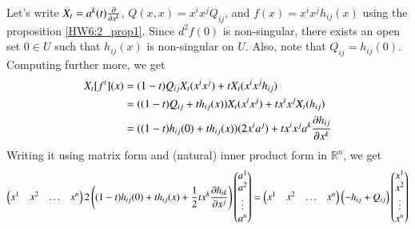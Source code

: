 \documentclass[a4paper, 12pt]{article}
\theoremstyle{Mydefinition}
\theoremstyle{Mytheorem}
\begin{document}
Let's write $X_t = a^k(t)\pdv{x^k}$, $Q(x,x)=x^ix^jQ_{ij}$, and $f(x) = x^ix^jh_{ij}(x)$ using the proposition \ref{HW6:2_prop1}. Since $d^2f(0)$ is non-singular, there exists an open set $0\in U$ such that $h_{ij}(x)$ is non-singular on $U$. Also, note that $Q_{ij} = h_{ij}(0)$. Computing further more, we get
\begin{equation*}
\begin{split}
    X_t[f^t](x) &= (1-t)Q_{ij}X_t(x^ix^j) + tX_t(x^ix^jh_{ij}) \\
    &=((1-t)Q_{ij} + th_{ij}(x))X_t(x^ix^j) + tx^ix^jX_t(h_{ij})\\
    &=((1-t)h_{ij}(0) + th_{ij}(x))(2x^i a^j) + tx^ix^ja^k\pdv{h_{ij}}{x^k}
\end{split}
\end{equation*}
Writing it using matrix form and (natural) inner product form in $\mathbb{R}^n$, we get
\begin{equation*}
    \begin{pmatrix}
    x^1 & x^2 & \hdots & x^n
    \end{pmatrix}
    2\left((1-t)h_{ij}(0) + th_{ij}(x) + \frac{1}{2}tx^k\pdv{h_{ik}}{x^j}\right)
    \begin{pmatrix}
    a^1 \\ a^2 \\ \vdots \\ a^n
    \end{pmatrix}
    =\begin{pmatrix}
    x^1 & x^2 & \hdots & x^n
    \end{pmatrix}
    \left(-h_{ij}+Q_{ij}\right)
    \begin{pmatrix}
    x^1 \\ x^2 \\ \vdots \\ x^n
    \end{pmatrix}
\end{equation*}
\end{document}
